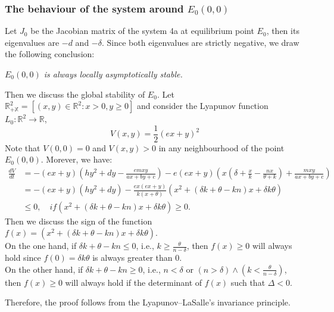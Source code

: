 \documentclass{article}
\begin{document}
\subsubsection{The behaviour of the system around $E_{0}(0,0)$}
Let $J_{0}$ be the Jacobian matrix of the system 4a at equilibrium
point $E_{0}$, then its eigenvalues are $-d$ and $-\delta$. Since both eigenvalues are 
strictly negative, we draw the following conclusion:
\begin{center}
    \textit{$E_{0}(0,0)$ is always locally asymptotically stable.}
\end{center}
\par Then we discuss the global stability of $E_{0}$. Let 
$\mathbb{R}^{2}_{+\mathbb{X}}=[(x,y)\in \mathbb{R}^{2}: x>0, y\geq 0]$ and 
consider the Lyapunov function 
$L_{0}:\mathbb{R}^{2}\rightarrow \mathbb{R}$,
\begin{equation}
    V(x,y)=\frac{1}{2}(ex+y)^{2}\tag{4a.0}
\end{equation}
Note that $V(0,0)=0$ and $V(x,y)>0$ in any neighbourhood of the point $E_{0}(0,0)$. Morever, we have:
\begin{align*}
    \frac{dV}{dt}&=-(ex+y)(hy^{2}+dy-\frac{emxy}{ax+by+c})-e(ex+y)\left(x(\delta+\frac{x}{k}-\frac{nx}{\theta+k})+\frac{mxy}{ax+by+c}\right)\\
    &=-(ex+y)(hy^{2}+dy)-\frac{ex(ex+y)}{k(x+\theta)}\left(x^{2}+(\delta k+\theta-kn)x+\delta k\theta\right)\\
    &\leq 0,\quad if \left(x^{2}+(\delta k+\theta-kn)x+\delta k\theta\right)\geq 0.
\end{align*}
Then we discuss the sign of the function $f(x)=\left(x^{2}+(\delta k+\theta-kn)x+\delta k\theta\right)$.\\
On the one hand, if $\delta k+\theta-kn\leq 0$, i.e., $k\geq \frac{\theta}{n-\delta}$, then $f(x)\geq 0$ will always hold since $f(0)=\delta k\theta$ is always greater than 0.\\
On the other hand, if $\delta k+\theta-kn\geq 0$, i.e., $n<\delta$ or $(n>\delta)\wedge (k<\frac{\theta}{n-\delta})$, then $f(x)\geq 0$ will always hold if the determinant of $f(x)$ such that $\Delta<0$.
\par Therefore, the proof follows from the Lyapunov–LaSalle’s invariance principle.\\
\end{document}
